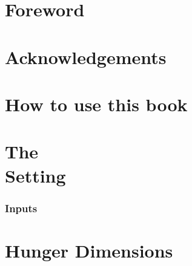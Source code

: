 \documentclass[print,Draft]{faosyb}
\begin{document}

\addtocounter{page}{1}  %

\mainmatter


%
\part*{Foreword}
\lipsum[1-6]

\part*{Ack\-now\-ledgements}
\lipsum[1-5]

\part*{How to use this book}


\tableofcontents
\listofcharts
\listofmaps
\listoftables



\part[The Setting]{The\\ Setting}
\lipsum
\EndPartIntro




\begin{tablepages}
\section{Inputs}
\small
  
\clearpage

\end{tablepages}


\part{Hunger Dimensions}
\lipsum
\EndPartIntro



\end{document}
